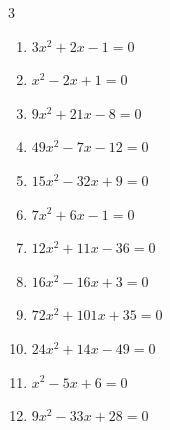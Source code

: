 \begin{multicols}{3}
\begin{enumerate}

\columnbreak %

  \item $3x^{2}+2x-1=0$


  \item $x^{2}-2x+1=0$

        \phantom{$\displaystyle x=1$}

  \item $9x^{2}+21x-8=0$


  \item $49x^{2}-7x-12=0$


  \item $15x^{2}-32x+9=0$


  \item $7x^{2}+6x-1=0$


  \item $12x^{2}+11x-36=0$


  \item $16x^{2}-16x+3=0$


  \item $72x^{2}+101x+35=0$


  \item $24x^{2}+14x-49=0$


\columnbreak %

\resetques

  \item $x^{2}-5x+6=0$

        \phantom{$\displaystyle x=3,\; 2$}

  \item $9x^{2}-33x+28=0$


\end{enumerate}
\end{multicols}
